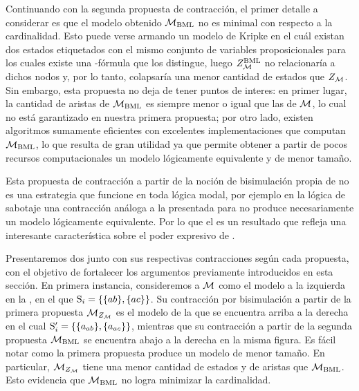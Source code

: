 Continuando con la segunda propuesta de contracción, el primer detalle a considerar es que el modelo obtenido $\model_\bml$ no es minimal 
con respecto a la cardinalidad. Esto puede verse armando un modelo de Kripke en el cuál existan dos estados etiquetados con el mismo conjunto 
de variables proposicionales para los cuales existe una \bml-fórmula que los distingue, luego $Z^{\bml}_\model$ no relacionaría a dichos 
nodos y, por lo tanto, colapsaría una menor cantidad de estados que $Z_\model$. Sin embargo, esta propuesta no deja de tener 
puntos de interes: en primer lugar, la cantidad de aristas de $\model_\bml$ es siempre menor o igual que las de $\model$, lo cual no está
garantizado en nuestra primera propuesta; por otro lado, existen algoritmos sumamente eficientes con excelentes 
implementaciones que computan $\model_\bml$, lo que resulta de gran utilidad ya que permite obtener a partir de pocos 
recursos computacionales un modelo lógicamente equivalente y de menor tamaño.

Esta propuesta de contracción a partir de la noción de bisimulación propia de \bml no es una estrategia que funcione en toda lógica 
modal, por ejemplo en la lógica de sabotaje \cite{AucherBG18,ArecesFH15} una contracción análoga a la presentada para \KHilogic 
no produce necesariamente un modelo lógicamente equivalente. Por lo que el  es un resultado 
que refleja una interesante característica sobre el poder expresivo de \KHilogic.

Presentaremos dos \ults junto con sus respectivas contracciones según cada propuesta, con el objetivo de fortalecer los argumentos 
previamente introducidos en esta sección. En primera instancia, consideremos a $\model$ como el modelo a la izquierda en la 
, en el que $\S_i = \{\{ab\}, \{ac\}\}$. Su contracción por bisimulación a partir de la primera propuesta $\fcont{\model}$ 
es el modelo de la  que se encuentra arriba a la derecha en el cual $\S'_i = \{\{a_{ab}\}, \{a_{ac}\} \}$, mientras 
que su contracción a partir de la segunda propuesta $\model_\bml$ se encuentra abajo a la derecha en la misma figura. Es fácil notar 
como la primera propuesta produce un modelo de menor tamaño. En particular, $\fcont{\model}$ tiene una menor cantidad de estados y de 
aristas que $\model_\bml$. Esto evidencia que $\model_\bml$ no logra minimizar la cardinalidad. 


